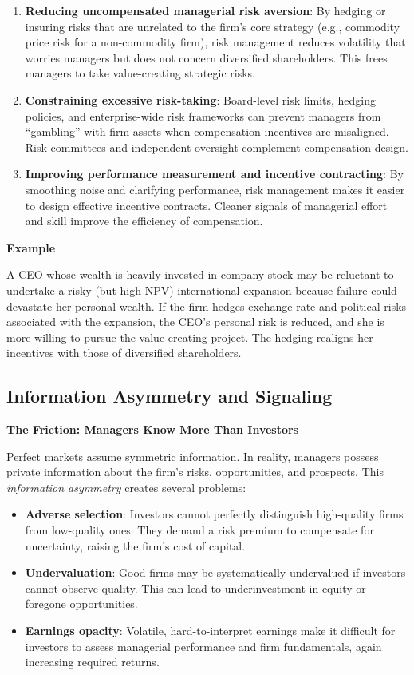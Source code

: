 \documentclass[11pt,openany]{book}
\providecommand{\tightlist}{\setlength{\itemsep}{0pt}\setlength{\parskip}{0pt}}
\begin{document}
\begin{enumerate}
\def\labelenumi{\arabic{enumi}.}
\item
  \textbf{Reducing uncompensated managerial risk aversion}: By hedging or insuring risks that are unrelated to the firm's core strategy (e.g., commodity price risk for a non-commodity firm), risk management reduces volatility that worries managers but does not concern diversified shareholders. This frees managers to take value-creating strategic risks.
\item
  \textbf{Constraining excessive risk-taking}: Board-level risk limits, hedging policies, and enterprise-wide risk frameworks can prevent managers from ``gambling'' with firm assets when compensation incentives are misaligned. Risk committees and independent oversight complement compensation design.
\item
  \textbf{Improving performance measurement and incentive contracting}: By smoothing noise and clarifying performance, risk management makes it easier to design effective incentive contracts. Cleaner signals of managerial effort and skill improve the efficiency of compensation.
\end{enumerate}

\textbf{Example}

A CEO whose wealth is heavily invested in company stock may be reluctant to undertake a risky (but high-NPV) international expansion because failure could devastate her personal wealth. If the firm hedges exchange rate and political risks associated with the expansion, the CEO's personal risk is reduced, and she is more willing to pursue the value-creating project. The hedging realigns her incentives with those of diversified shareholders.

\subsection{Information Asymmetry and Signaling}\label{information-asymmetry-and-signaling}

\textbf{The Friction: Managers Know More Than Investors}

Perfect markets assume symmetric information. In reality, managers possess private information about the firm's risks, opportunities, and prospects. This \emph{information asymmetry} creates several problems:

\begin{itemize}
\tightlist
\item
  \textbf{Adverse selection}: Investors cannot perfectly distinguish high-quality firms from low-quality ones. They demand a risk premium to compensate for uncertainty, raising the firm's cost of capital.
\item
  \textbf{Undervaluation}: Good firms may be systematically undervalued if investors cannot observe quality. This can lead to underinvestment in equity or foregone opportunities.
\item
  \textbf{Earnings opacity}: Volatile, hard-to-interpret earnings make it difficult for investors to assess managerial performance and firm fundamentals, again increasing required returns.
\end{itemize}
\end{document}
